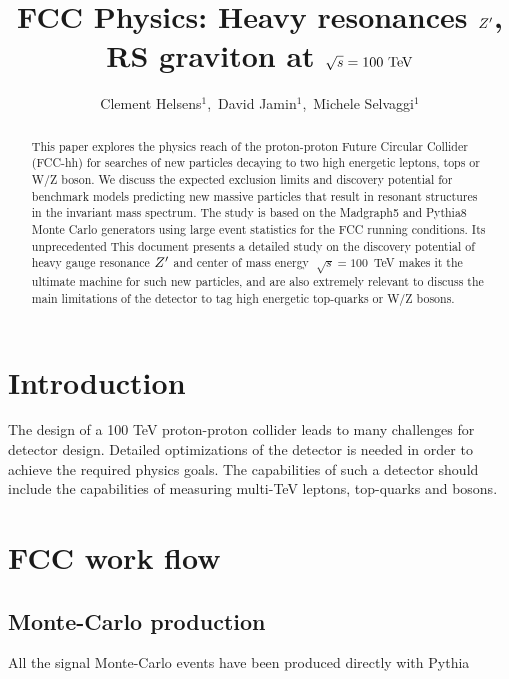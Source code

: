 \documentclass{cernrep}
\begin{document}
\title{FCC Physics: Heavy resonances $Z^{\prime}$, RS graviton at $\sqrt{s} = 100 \TeV$}
\author{Clement Helsens${}^1$,\,
David Jamin${}^1$,\,
Michele Selvaggi${}^1$}


\begin{abstract}
This paper explores the physics reach of the proton-proton Future Circular Collider (FCC-hh)
for searches of new particles decaying to two high energetic leptons, tops or W/Z boson. We discuss the expected exclusion limits and discovery potential for benchmark models 
predicting new massive particles that result in resonant structures in
the invariant mass spectrum. The study is based on the Madgraph5 and Pythia8 Monte Carlo generators using large event statistics for the FCC running conditions. 
Its unprecedented  
This document presents a detailed study on the discovery potential of heavy gauge resonance $Z^{\prime}$ and center of mass energy $\sqrt[]{s} =100$~TeV makes it the ultimate machine for such new particles, and are also extremely relevant to discuss the main limitations of the detector to tag high energetic top-quarks or W/Z bosons.
\end{abstract}
\maketitle
\tableofcontents

\section{Introduction}
The design of a 100 TeV proton-proton collider leads to many challenges for detector design. Detailed optimizations of the detector is needed in order to achieve the required physics goals. The capabilities of such a detector should include the capabilities of measuring multi-TeV leptons, top-quarks and bosons.

\section{FCC work flow}
\subsection{Monte-Carlo production}
All the signal Monte-Carlo events have been produced directly with Pythia 
\end{document}
